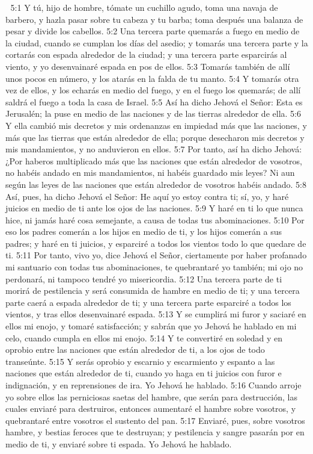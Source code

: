 
5:1 Y tú, hijo de hombre, tómate un cuchillo agudo, toma una navaja de barbero, y hazla pasar sobre tu cabeza y tu barba; toma después una balanza de pesar y divide los cabellos.  
5:2 Una tercera parte quemarás a fuego en medio de la ciudad, cuando se cumplan los días del asedio; y tomarás una tercera parte y la cortarás con espada alrededor de la ciudad; y una tercera parte esparcirás al viento, y yo desenvainaré espada en pos de ellos.  
5:3 Tomarás también de allí unos pocos en número, y los atarás en la falda de tu manto.  
5:4 Y tomarás otra vez de ellos, y los echarás en medio del fuego, y en el fuego los quemarás; de allí saldrá el fuego a toda la casa de Israel.  
5:5 Así ha dicho Jehová el Señor: Esta es Jerusalén; la puse en medio de las naciones y de las tierras alrededor de ella.  
5:6 Y ella cambió mis decretos y mis ordenanzas en impiedad más que las naciones, y más que las tierras que están alrededor de ella; porque desecharon mis decretos y mis mandamientos, y no anduvieron en ellos.  
5:7 Por tanto, así ha dicho Jehová: ¿Por haberos multiplicado más que las naciones que están alrededor de vosotros, no habéis andado en mis mandamientos, ni habéis guardado mis leyes? Ni aun según las leyes de las naciones que están alrededor de vosotros habéis andado.  
5:8 Así, pues, ha dicho Jehová el Señor: He aquí yo estoy contra ti; sí, yo, y haré juicios en medio de ti ante los ojos de las naciones.  
5:9 Y haré en ti lo que nunca hice, ni jamás haré cosa semejante, a causa de todas tus abominaciones. 
5:10 Por eso los padres comerán a los hijos en medio de ti, y los hijos comerán a sus padres; y haré en ti juicios, y esparciré a todos los vientos todo lo que quedare de ti.  
5:11 Por tanto, vivo yo, dice Jehová el Señor, ciertamente por haber profanado mi santuario con todas tus abominaciones, te quebrantaré yo también; mi ojo no perdonará, ni tampoco tendré yo misericordia.  
5:12 Una tercera parte de ti morirá de pestilencia y será consumida de hambre en medio de ti; y una tercera parte caerá a espada alrededor de ti; y una tercera parte esparciré a todos los vientos, y tras ellos desenvainaré espada.  
5:13 Y se cumplirá mi furor y saciaré en ellos mi enojo, y tomaré satisfacción; y sabrán que yo Jehová he hablado en mi celo, cuando cumpla en ellos mi enojo.  
5:14 Y te convertiré en soledad y en oprobio entre las naciones que están alrededor de ti, a los ojos de todo transeúnte.  
5:15 Y serás oprobio y escarnio y escarmiento y espanto a las naciones que están alrededor de ti, cuando yo haga en ti juicios con furor e indignación, y en reprensiones de ira. Yo Jehová he hablado.  
5:16 Cuando arroje yo sobre ellos las perniciosas saetas del hambre, que serán para destrucción, las cuales enviaré para destruiros, entonces aumentaré el hambre sobre vosotros, y quebrantaré entre vosotros el sustento del pan.  
5:17 Enviaré, pues, sobre vosotros hambre, y bestias feroces que te destruyan; y pestilencia y sangre pasarán por en medio de ti, y enviaré sobre ti espada.  Yo Jehová he hablado.  

